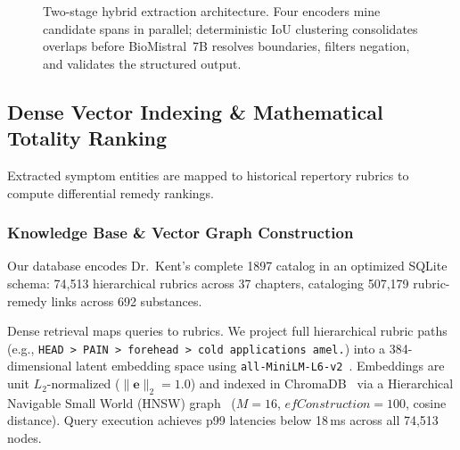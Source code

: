 \begin{figure}[!t]
{%
}
\caption{Two-stage hybrid extraction architecture. Four encoders mine candidate spans in parallel; deterministic IoU clustering consolidates overlaps before BioMistral~7B resolves boundaries, filters negation, and validates the structured output.}
\label{fig:two_stage_hybrid}
\end{figure}


\subsection{Dense Vector Indexing \& Mathematical Totality Ranking}

Extracted symptom entities are mapped to historical repertory rubrics to compute differential remedy rankings.

\subsubsection{Knowledge Base \& Vector Graph Construction}
Our database encodes Dr.~Kent's complete 1897 catalog in an optimized SQLite schema: 74,513 hierarchical rubrics across 37 chapters, cataloging 507,179 rubric-remedy links across 692 substances.

Dense retrieval maps queries to rubrics. We project full hierarchical rubric paths (e.g., \texttt{HEAD > PAIN > forehead > cold applications amel.}) into a 384-dimensional latent embedding space using \texttt{all-MiniLM-L6-v2}~\cite{reimers2019sentence}. Embeddings are unit $L_2$-normalized ($\|\mathbf{e}\|_2 = 1.0$) and indexed in ChromaDB~\cite{chromadb2023} via a Hierarchical Navigable Small World (HNSW) graph~\cite{malkov2018efficient} ($M=16$, $efConstruction=100$, cosine distance). Query execution achieves p99 latencies below 18\,ms across all 74,513 nodes.

